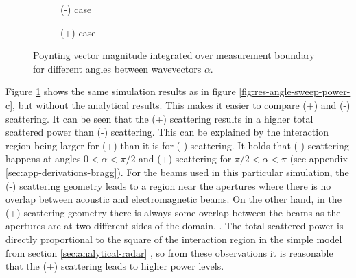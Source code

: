 \documentclass[11pt,twoside]{eitExjobb}
\begin{document}
	\begin{figure}[H]
		\centering
		\begin{subfigure}{\textwidth}
			\resizebox{\textwidth}{!}{
				
			}
			\caption{(-) case}
		\end{subfigure}
		\begin{subfigure}{\textwidth}
			\resizebox{\textwidth}{!}{
				
			}
			\caption{(+) case}
		\end{subfigure}
		\caption{\label{fig:res-angle-sweep-power} Poynting vector magnitude integrated over measurement boundary for different angles between wavevectors $\alpha$.}
	\end{figure}
	
	
	Figure \ref{fig:res-angle-sweep-power} shows the same simulation results as in figure \ref{fig:res-angle-sweep-power-c}, but without the analytical results. This makes it easier to compare (+) and (-) scattering.	It can be seen that the (+) scattering results in a higher total scattered power than (-) scattering. This can be explained by the interaction region being larger for (+) than it is for (-) scattering. It holds that (-) scattering happens at angles $0 < \alpha < \pi/2$ and (+) scattering for $\pi/2 < \alpha < \pi$ (see appendix \ref{sec:app-derivations-bragg}). For the beams used in this particular simulation, the (-) scattering geometry leads to a region near the apertures where there is no overlap between acoustic and electromagnetic beams. On the other hand, in the (+) scattering geometry there is always some overlap between the beams as the apertures are at two different sides of the domain. . The total scattered power is directly proportional to the square of the interaction region in the simple model from section \ref{sec:analytical-radar} , so from these observations it is reasonable that the (+) scattering leads to higher power levels. 
	
\end{document}
